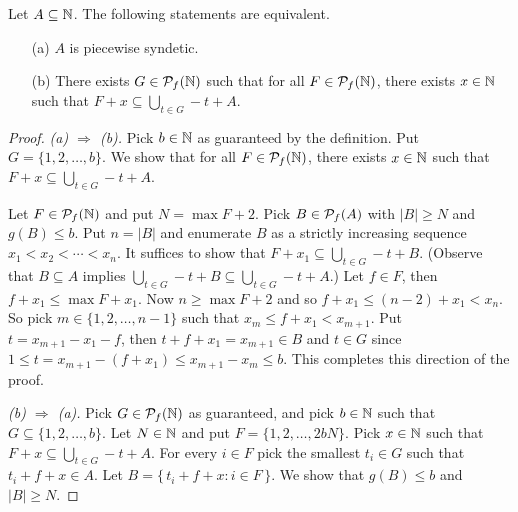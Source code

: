 \begin{prop}
  Let $A \subseteq \mathbb{N}$.
  The following statements are equivalent.
  \begin{itemize}
    \item[(a)] $A$ is piecewise syndetic.
    
    \item[(b)] There exists $G \in \mathcal{P}_f(\mathbb{N})$ such that for all $F \in \mathcal{P}_f(\mathbb{N})$, there exists $x \in \mathbb{N}$ such that $F+x \subseteq \bigcup_{t \in G} -t+A$. 
  \end{itemize}
\end{prop}
\begin{proof}
  \textsl{(a) $\Rightarrow$ (b).}
  Pick $b \in \mathbb{N}$ as guaranteed by the definition. 
  Put $G = \{1, 2, \ldots, b\}$.
  We show that for all $F \in \mathcal{P}_f(\mathbb{N})$, there exists $x \in \mathbb{N}$ such that $F+x \subseteq \bigcup_{t \in G} -t + A$.

  Let $F \in \mathcal{P}_f(\mathbb{N})$ and put $N =  \max F + 2$. 
  Pick $B \in \mathcal{P}_f(A)$ with $|B| \ge N$ and $g(B) \le b$. 
  Put $n = |B|$ and enumerate $B$ as a strictly increasing sequence $x_1 < x_2 < \cdots  < x_n$.
  It suffices to show that $F + x_1 \subseteq \bigcup_{t \in G} -t + B$.
  (Observe that $B \subseteq A$ implies $\bigcup_{t \in G} -t + B \subseteq \bigcup_{t \in G} -t + A$.)
  Let $f \in F$, then $f + x_1 \le \max F + x_1$. 
  Now $n \ge \max F + 2$ and so $f + x_1 \le (n-2) + x_1 < x_n$. 
  So pick $m \in \{1, 2, \ldots, n-1\}$ such that $x_m \le f+x_1  < x_{m+1}$. 
  Put $t = x_{m+1} - x_1 - f$, then $t + f + x_1 = x_{m+1} \in B$ and $t \in G$ since $1 \le t = x_{m+1}- (f + x_1) \le x_{m+1} - x_m \le b$. 
  This completes this direction of the proof.  
  
  \textsl{(b) $\Rightarrow$ (a).}
  Pick $G \in \mathcal{P}_f(\mathbb{N})$ as guaranteed, and pick $b \in \mathbb{N}$ such that $G \subseteq \{1, 2, \ldots, b\}$. 
  Let $N \in \mathbb{N}$ and put $F = \{1, 2, \ldots, 2bN\}$. 
  Pick $x \in \mathbb{N}$ such that $F + x \subseteq \bigcup_{t \in G} -t+A$. 
  For every $i \in F$ pick the smallest $t_i \in G$ such that $t_i + f + x \in A$. 
  Let $B = \{\, t_i + f + x : i \in F \,\}$.
  We show that $g(B) \le b$ and $|B| \ge N$.


\end{proof}
